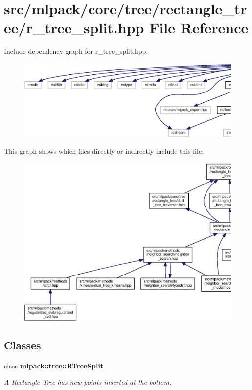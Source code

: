 \section{src/mlpack/core/tree/rectangle\+\_\+tree/r\+\_\+tree\+\_\+split.hpp File Reference}
\label{r__tree__split_8hpp}
Include dependency graph for r\+\_\+tree\+\_\+split.\+hpp\+:
\nopagebreak
\begin{figure}[H]
\begin{center}
\leavevmode
\includegraphics[width=350pt]{r__tree__split_8hpp__incl}
\end{center}
\end{figure}
This graph shows which files directly or indirectly include this file\+:
\nopagebreak
\begin{figure}[H]
\begin{center}
\leavevmode
\includegraphics[width=350pt]{r__tree__split_8hpp__dep__incl}
\end{center}
\end{figure}
\subsection*{Classes}
\begin{DoxyCompactItemize}
\item 
class {\bf mlpack\+::tree\+::\+R\+Tree\+Split}
\begin{DoxyCompactList}\small\item\em A Rectangle Tree has new points inserted at the bottom. \end{DoxyCompactList}\end{DoxyCompactItemize}
